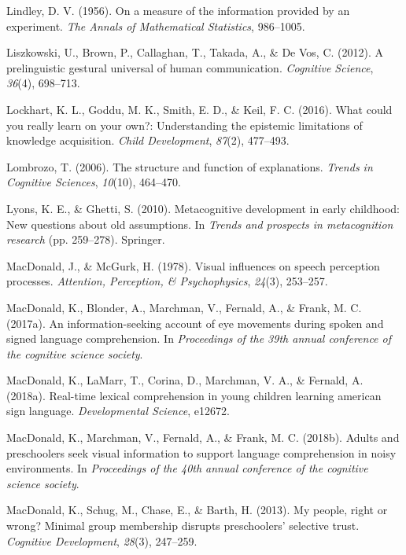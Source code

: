 \documentclass[oneside]{report}
\begin{document}
\hypertarget{ref-lindley1956measure}{}
Lindley, D. V. (1956). On a measure of the information provided by an
experiment. \emph{The Annals of Mathematical Statistics}, 986--1005.

\hypertarget{ref-liszkowski2012prelinguistic}{}
Liszkowski, U., Brown, P., Callaghan, T., Takada, A., \& De Vos, C.
(2012). A prelinguistic gestural universal of human communication.
\emph{Cognitive Science}, \emph{36}(4), 698--713.

\hypertarget{ref-lockhart2016could}{}
Lockhart, K. L., Goddu, M. K., Smith, E. D., \& Keil, F. C. (2016). What
could you really learn on your own?: Understanding the epistemic
limitations of knowledge acquisition. \emph{Child Development},
\emph{87}(2), 477--493.

\hypertarget{ref-lombrozo2006structure}{}
Lombrozo, T. (2006). The structure and function of explanations.
\emph{Trends in Cognitive Sciences}, \emph{10}(10), 464--470.

\hypertarget{ref-lyons2010metacognitive}{}
Lyons, K. E., \& Ghetti, S. (2010). Metacognitive development in early
childhood: New questions about old assumptions. In \emph{Trends and
prospects in metacognition research} (pp. 259--278). Springer.

\hypertarget{ref-macdonald1978visual}{}
MacDonald, J., \& McGurk, H. (1978). Visual influences on speech
perception processes. \emph{Attention, Perception, \& Psychophysics},
\emph{24}(3), 253--257.

\hypertarget{ref-macdonald2017info}{}
MacDonald, K., Blonder, A., Marchman, V., Fernald, A., \& Frank, M. C.
(2017a). An information-seeking account of eye movements during spoken
and signed language comprehension. In \emph{Proceedings of the 39th
annual conference of the cognitive science society}.

\hypertarget{ref-macdonald2018real}{}
MacDonald, K., LaMarr, T., Corina, D., Marchman, V. A., \& Fernald, A.
(2018a). Real-time lexical comprehension in young children learning
american sign language. \emph{Developmental Science}, e12672.

\hypertarget{ref-macdonald2018noise}{}
MacDonald, K., Marchman, V., Fernald, A., \& Frank, M. C. (2018b).
Adults and preschoolers seek visual information to support language
comprehension in noisy environments. In \emph{Proceedings of the 40th
annual conference of the cognitive science society}.

\hypertarget{ref-macdonald2013my}{}
MacDonald, K., Schug, M., Chase, E., \& Barth, H. (2013). My people,
right or wrong? Minimal group membership disrupts preschoolers'
selective trust. \emph{Cognitive Development}, \emph{28}(3), 247--259.
\end{document}
